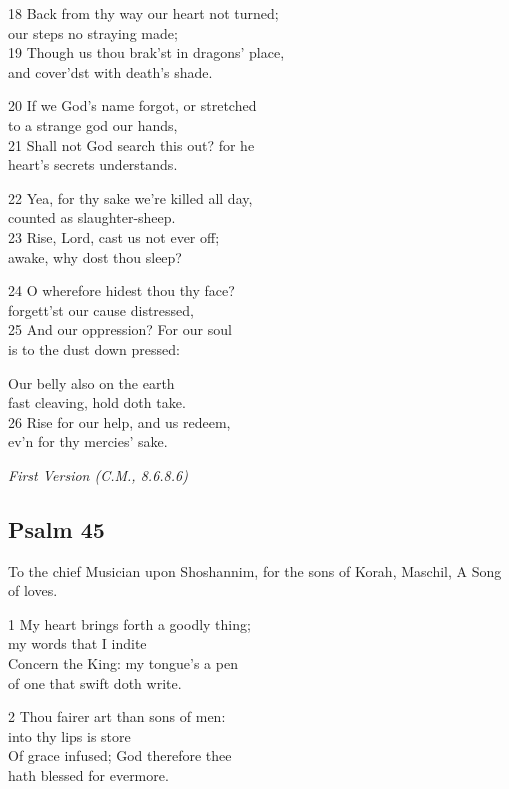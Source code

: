 18 Back from thy way our heart not turned;\\
our steps no straying made;\\
19 Though us thou brak’st in dragons’ place,\\
and cover’dst with death’s shade.

20 If we God’s name forgot, or stretched\\
to a strange god our hands,\\
21 Shall not God search this out? for he\\
heart’s secrets understands.

22 Yea, for thy sake we’re killed all day,\\
counted as slaughter-sheep.\\
23 Rise, Lord, cast us not ever off;\\
awake, why dost thou sleep?

24 O wherefore hidest thou thy face?\\
forgett’st our cause distressed,\\
25 And our oppression? For our soul\\
is to the dust down pressed:

Our belly also on the earth\\
fast cleaving, hold doth take.\\
26 Rise for our help, and us redeem,\\
ev’n for thy mercies’ sake.

\begin{center}
\quad{}\quad{}
\end{center}

\emph{First Version (C.M., 8.6.8.6)}

\subsection*{Psalm 45}

To the chief Musician upon Shoshannim,
for the sons of Korah, Maschil, A Song of loves.

1 My heart brings forth a goodly thing;\\
my words that I indite\\
Concern the King: my tongue’s a pen\\
of one that swift doth write.

2 Thou fairer art than sons of men:\\
into thy lips is store\\
Of grace infused; God therefore thee\\
hath blessed for evermore.

